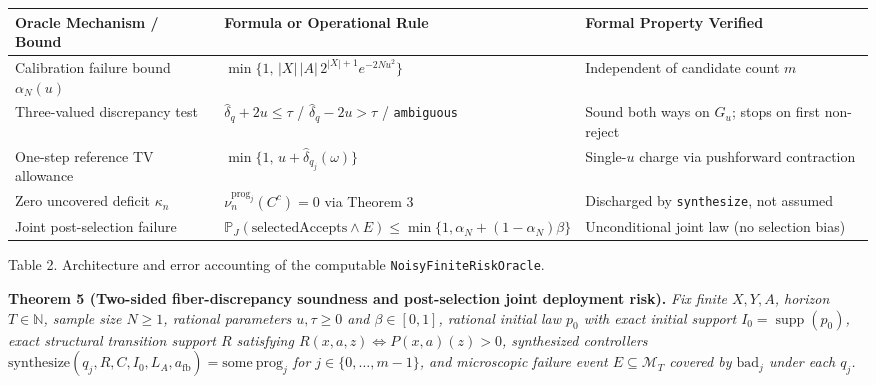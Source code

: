\documentclass[11pt,a4paper]{article}
\newcounter{none}
\begin{document}
{\def\LTcaptype{none} %
\begin{longtable}[]{@{}
  >{\raggedright\arraybackslash}p{}
  >{\raggedright\arraybackslash}p{}
  >{\raggedright\arraybackslash}p{}@{}}
\toprule\noalign{}
\begin{minipage}[b]{\linewidth}\raggedright
Oracle Mechanism / Bound
\end{minipage} & \begin{minipage}[b]{\linewidth}\raggedright
Formula or Operational Rule
\end{minipage} & \begin{minipage}[b]{\linewidth}\raggedright
Formal Property Verified
\end{minipage} \\
\midrule\noalign{}
\endhead
\bottomrule\noalign{}
\endlastfoot
Calibration failure bound \(\alpha_N(u)\) &
\(\min\{1,\, |X|\,|A|\, 2^{|X|+1} e^{-2Nu^2}\}\) & Independent of
candidate count \(m\) \\
Three-valued discrepancy test & \(\widehat{\delta}_q + 2u \le \tau\) /
\(\widehat{\delta}_q - 2u > \tau\) / \texttt{ambiguous} & Sound both
ways on \(G_u\); stops on first non-reject \\
One-step reference TV allowance &
\(\min\{1,\, u + \widehat{\delta}_{q_j}(\omega)\}\) & Single-\(u\)
charge via pushforward contraction \\
Zero uncovered deficit \(\kappa_n\) &
\(\nu_n^{\mathrm{prog}_j}(C^c) = 0\) via Theorem 3 & Discharged by
\texttt{synthesize}, not assumed \\
Joint post-selection failure &
\(\mathbb{P}_J(\mathrm{selectedAccepts} \land E) \le \min\{1, \alpha_N + (1-\alpha_N)\beta\}\)
& Unconditional joint law (no selection bias) \\
\end{longtable}
}

Table 2. Architecture and error accounting of the computable
\texttt{NoisyFiniteRiskOracle}.

\textbf{Theorem 5 (Two-sided fiber-discrepancy soundness and
post-selection joint deployment risk).} \emph{Fix finite \(X, Y, A\),
horizon \(T \in \mathbb{N}\), sample size \(N \ge 1\), rational
parameters \(u, \tau \ge 0\) and \(\beta \in [0,1]\), rational initial
law \(p_0\) with exact initial support
\(I_0 = \operatorname{supp}(p_0)\), exact structural transition support
\(R\) satisfying \(R(x,a,z) \iff P(x,a)(z) > 0\), synthesized
controllers
\(\mathrm{synthesize}(q_j, R, C, I_0, L_A, a_{\mathrm{fb}}) = \mathrm{some\ prog}_j\)
for \(j \in \{0, \dots, m-1\}\), and microscopic failure event
\(E \subseteq \mathcal{M}_T\) covered by \(\mathrm{bad}_j\) under each
\(q_j\).}
\end{document}
